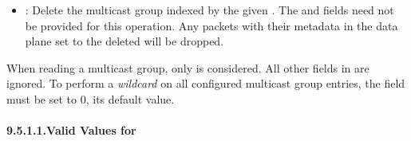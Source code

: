 \documentclass[11pt]{article}
\begin{document}
{\begin{itemize}[noitemsep,topsep=\mdcompacttopsep]
\item{}: Delete the multicast group indexed by the given
. The  and  fields need not be
provided for this operation. Any packets with their 
metadata in the data plane set to the deleted  will be
dropped.%
\end{itemize}%

\noindent{}When reading a multicast group, only  is considered. All
other fields in  are ignored. To perform a \emph{wildcard}
 on all configured multicast group entries, the  field
must be set to 0, its default value.%

\paragraph{9.5.1.1.\hspace*{0.5em}Valid Values for }\label{sec-valid-values-for-mg-id}%

}
\end{document}
